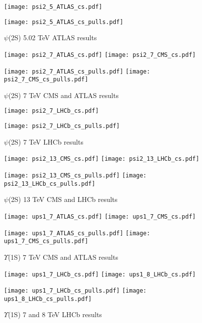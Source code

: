 \documentclass{article}
\begin{document}
\clearpage

\begin{figure}
\centering
\texttt{[image: psi2\_5\_ATLAS\_cs.pdf]}

\texttt{[image: psi2\_5\_ATLAS\_cs\_pulls.pdf]}
\caption{$\psi$(2S) 5.02 TeV ATLAS results}
\end{figure}

\clearpage

\begin{figure}
\centering
\texttt{[image: psi2\_7\_ATLAS\_cs.pdf]}
\texttt{[image: psi2\_7\_CMS\_cs.pdf]}

\texttt{[image: psi2\_7\_ATLAS\_cs\_pulls.pdf]}
\texttt{[image: psi2\_7\_CMS\_cs\_pulls.pdf]}
\caption{$\psi$(2S) 7 TeV CMS and ATLAS results}
\end{figure}

\clearpage

\begin{figure}
\centering
\texttt{[image: psi2\_7\_LHCb\_cs.pdf]}

\texttt{[image: psi2\_7\_LHCb\_cs\_pulls.pdf]}
\caption{$\psi$(2S) 7 TeV LHCb results}
\end{figure}

\clearpage

\begin{figure}
\centering
\texttt{[image: psi2\_13\_CMS\_cs.pdf]}
\texttt{[image: psi2\_13\_LHCb\_cs.pdf]}

\texttt{[image: psi2\_13\_CMS\_cs\_pulls.pdf]}
\texttt{[image: psi2\_13\_LHCb\_cs\_pulls.pdf]}
\caption{$\psi$(2S) 13 TeV CMS and LHCb results}
\end{figure}

\clearpage

\begin{figure}
\centering
\texttt{[image: ups1\_7\_ATLAS\_cs.pdf]}
\texttt{[image: ups1\_7\_CMS\_cs.pdf]}

\texttt{[image: ups1\_7\_ATLAS\_cs\_pulls.pdf]}
\texttt{[image: ups1\_7\_CMS\_cs\_pulls.pdf]}
\caption{$\Upsilon$(1S) 7 TeV CMS and ATLAS results}
\end{figure}

\clearpage

\begin{figure}
\centering
\texttt{[image: ups1\_7\_LHCb\_cs.pdf]}
\texttt{[image: ups1\_8\_LHCb\_cs.pdf]}

\texttt{[image: ups1\_7\_LHCb\_cs\_pulls.pdf]}
\texttt{[image: ups1\_8\_LHCb\_cs\_pulls.pdf]}
\caption{$\Upsilon$(1S) 7 and 8 TeV LHCb results}
\end{figure}
\end{document}
